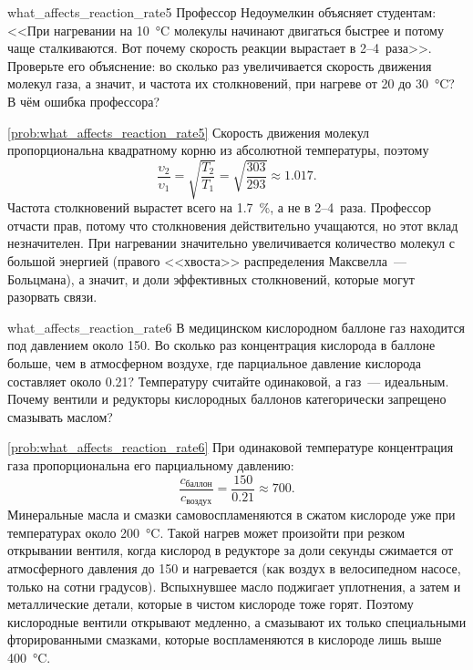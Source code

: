 \begin{problem}{}{what_affects_reaction_rate5}
    Профессор Недоумелкин объясняет студентам: <<При нагревании на \qty{10}{\degreeCelsius} молекулы начинают двигаться быстрее и потому чаще сталкиваются. Вот почему скорость реакции вырастает в 2--4~раза>>. Проверьте его объяснение: во сколько раз увеличивается скорость движения молекул газа, а значит, и частота их столкновений, при нагреве от 20 до \qty{30}{\degreeCelsius}? В чём ошибка профессора?
    \begin{sol}{\ref{prob:what_affects_reaction_rate5}}
        Скорость движения молекул пропорциональна квадратному корню из абсолютной температуры, поэтому
        \begin{equation*}
            \frac{\upsilon_2}{\upsilon_1} = \sqrt{\frac{T_2}{T_1}} = \sqrt{\frac{303}{293}} \approx \num{1,017}.
        \end{equation*}
        Частота столкновений вырастет всего на \qty{1,7}{\percent}, а не в 2--4~раза. Профессор отчасти прав, потому что столкновения действительно учащаются, но этот вклад незначителен. При нагревании значительно увеличивается количество молекул с большой энергией (правого <<хвоста>> распределения Максвелла~--- Больцмана), а значит, и доли эффективных столкновений, которые могут разорвать связи.
    \end{sol}
\end{problem}

\begin{problem}{}{what_affects_reaction_rate6}
    В медицинском кислородном баллоне газ находится под давлением около \qty{150}{\ruBar}. Во сколько раз концентрация кислорода в баллоне больше, чем в атмосферном воздухе, где парциальное давление кислорода составляет около \qty{0,21}{\ruBar}? Температуру считайте одинаковой, а газ~--- идеальным. Почему вентили и редукторы кислородных баллонов категорически запрещено смазывать маслом?
    \begin{sol}{\ref{prob:what_affects_reaction_rate6}}
        При одинаковой температуре концентрация газа пропорциональна его парциальному давлению:
        \begin{equation*}
            \frac{c_{\text{баллон}}}{c_{\text{воздух}}} = \frac{150}{\num{0,21}} \approx 700.
        \end{equation*}
        Минеральные масла и смазки самовоспламеняются в сжатом кислороде уже при температурах около \qty{200}{\degreeCelsius}. Такой нагрев может произойти при резком открывании вентиля, когда кислород в редукторе за доли секунды сжимается от атмосферного давления до \qty{150}{\ruBar} и нагревается (как воздух в велосипедном насосе, только на сотни градусов). Вспыхнувшее масло поджигает уплотнения, а затем и металлические детали, которые в чистом кислороде тоже горят. Поэтому кислородные вентили открывают медленно, а смазывают их только специальными фторированными смазками, которые воспламеняются в кислороде лишь выше \qty{400}{\degreeCelsius}.
    \end{sol}
\end{problem}

